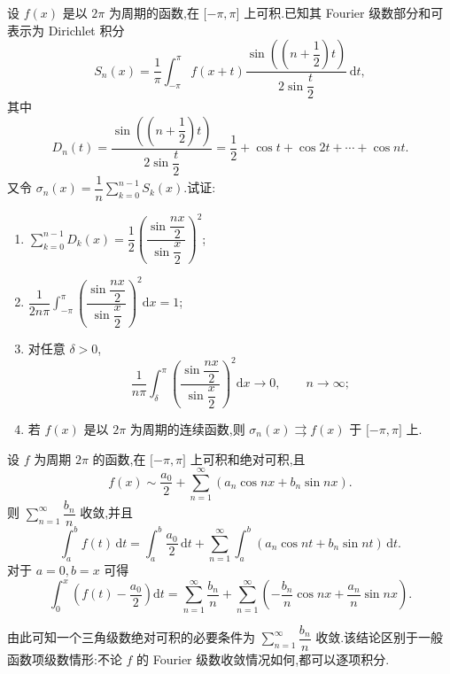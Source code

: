 \documentclass[../数学分析培优讲义.tex]{subfiles}
\begin{document}
\begin{example}
设 $f(x)$ 是以 $2\pi$ 为周期的函数,在 $\lbrack -\pi,\pi\rbrack$ 上可积.已知其 Fourier 级数部分和可表示为 Dirichlet 积分
\[
    S_n(x)=\dfrac{1}{\pi}\int_{-\pi}^{\pi}f(x+t)
    \dfrac{\sin\left((n+\dfrac{1}{2})t\right)}{2\sin\dfrac{t}{2}}\,\mathrm{d}t,
\]
其中
\[
    D_n(t)=\dfrac{\sin\left((n+\dfrac{1}{2})t\right)}{2\sin\dfrac{t}{2}}
    =\dfrac{1}{2}+\cos t+\cos2t+\cdots+\cos nt.
\]
又令 $\displaystyle\sigma_n(x)=\dfrac{1}{n}\sum\limits_{k=0}^{n-1}S_k(x)$.试证:
\begin{enumerate}[label=(\arabic*)]
    \item $\displaystyle\sum\limits_{k=0}^{n-1}D_k(x)=\dfrac{1}{2}\left(\dfrac{\sin\dfrac{nx}{2}}{\sin\dfrac{x}{2}}\right)^2$;
    \item $\displaystyle\dfrac{1}{2n\pi}\int_{-\pi}^{\pi}\left(\dfrac{\sin\dfrac{nx}{2}}{\sin\dfrac{x}{2}}\right)^2\mathrm{d}x=1$;
    \item 对任意 $\delta>0$,
    \[
        \dfrac{1}{n\pi}\int_{\delta}^{\pi}\left(\dfrac{\sin\dfrac{nx}{2}}{\sin\dfrac{x}{2}}\right)^2\mathrm{d}x\to0,
        \qquad n\to\infty;
    \]
    \item 若 $f(x)$ 是以 $2\pi$ 为周期的连续函数,则 $\sigma_n(x)\rightrightarrows f(x)$ 于 $\lbrack -\pi,\pi\rbrack$ 上.
\end{enumerate}
\end{example}
\exampleblank

\begin{theorem}
设 $f$ 为周期 $2\pi$ 的函数,在 $\lbrack -\pi,\pi\rbrack$ 上可积和绝对可积,且
\[
    f(x)\sim\dfrac{a_0}{2}+\sum\limits_{n=1}^{\infty}(a_n\cos nx+b_n\sin nx).
\]
则 $\displaystyle\sum\limits_{n=1}^{\infty}\dfrac{b_n}{n}$ 收敛,并且
\[
    \int_a^bf(t)\,\mathrm{d}t
    =\int_a^b\dfrac{a_0}{2}\,\mathrm{d}t
    +\sum\limits_{n=1}^{\infty}\int_a^b(a_n\cos nt+b_n\sin nt)\,\mathrm{d}t.
\]
对于 $a=0,b=x$ 可得
\[
    \int_0^x\left(f(t)-\dfrac{a_0}{2}\right)\mathrm{d}t
    =\sum\limits_{n=1}^{\infty}\dfrac{b_n}{n}
    +\sum\limits_{n=1}^{\infty}\left(-\dfrac{b_n}{n}\cos nx+\dfrac{a_n}{n}\sin nx\right).
\]
\end{theorem}

\begin{remark}
由此可知一个三角级数绝对可积的必要条件为 $\displaystyle\sum\limits_{n=1}^{\infty}\dfrac{b_n}{n}$ 收敛.该结论区别于一般函数项级数情形:不论 $f$ 的 Fourier 级数收敛情况如何,都可以逐项积分.
\end{remark}
\end{document}

